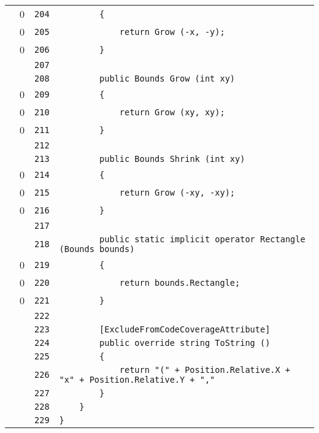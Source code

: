 \documentclass[a4paper,10pt]{article}
\begin{document}
\begin{longtable}[l]{lrrl}
\cellcolor{red} & 0 & \verb~204~ & \verb~        {~\\
\cellcolor{red} & 0 & \verb~205~ & \verb~            return Grow (-x, -y);~\\
\cellcolor{red} & 0 & \verb~206~ & \verb~        }~\\
\cellcolor{gray} &  & \verb~207~ & \verb~~\\
\cellcolor{gray} &  & \verb~208~ & \verb~        public Bounds Grow (int xy)~\\
\cellcolor{red} & 0 & \verb~209~ & \verb~        {~\\
\cellcolor{red} & 0 & \verb~210~ & \verb~            return Grow (xy, xy);~\\
\cellcolor{red} & 0 & \verb~211~ & \verb~        }~\\
\cellcolor{gray} &  & \verb~212~ & \verb~~\\
\cellcolor{gray} &  & \verb~213~ & \verb~        public Bounds Shrink (int xy)~\\
\cellcolor{red} & 0 & \verb~214~ & \verb~        {~\\
\cellcolor{red} & 0 & \verb~215~ & \verb~            return Grow (-xy, -xy);~\\
\cellcolor{red} & 0 & \verb~216~ & \verb~        }~\\
\cellcolor{gray} &  & \verb~217~ & \verb~~\\
\cellcolor{gray} &  & \verb~218~ & \verb~        public static implicit operator Rectangle (Bounds bounds)~\\
\cellcolor{red} & 0 & \verb~219~ & \verb~        {~\\
\cellcolor{red} & 0 & \verb~220~ & \verb~            return bounds.Rectangle;~\\
\cellcolor{red} & 0 & \verb~221~ & \verb~        }~\\
\cellcolor{gray} &  & \verb~222~ & \verb~~\\
\cellcolor{gray} &  & \verb~223~ & \verb~        [ExcludeFromCodeCoverageAttribute]~\\
\cellcolor{gray} &  & \verb~224~ & \verb~        public override string ToString ()~\\
\cellcolor{gray} &  & \verb~225~ & \verb~        {~\\
\cellcolor{gray} &  & \verb~226~ & \verb~            return "(" + Position.Relative.X + "x" + Position.Relative.Y + ","~\\
\cellcolor{gray} &  & \verb~227~ & \verb~        }~\\
\cellcolor{gray} &  & \verb~228~ & \verb~    }~\\
\cellcolor{gray} &  & \verb~229~ & \verb~}~\\
\end{longtable}
\newpage
\end{document}
